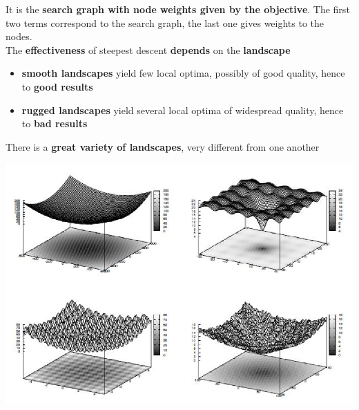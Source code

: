 \documentclass[11pt]{article}
\begin{document}
	It is the \textbf{search graph with node weights given by the objective}. The first two terms correspond to the search graph, the last one gives weights to the nodes.\\
	
	The \textbf{effectiveness} of steepest descent \textbf{depends} on the \textbf{landscape}
	\begin{itemize}
		\item \textbf{smooth landscapes} yield few local optima, possibly of good quality, hence to \textbf{good results}
		
		\item \textbf{rugged landscapes} yield several local optima of widespread quality, hence to \textbf{bad results}
	\end{itemize}
	
	There is a \textbf{great variety of landscapes}, very different from one another
	\begin{center}
		\includegraphics[width=0.9\columnwidth]{img/landscape1}
	\end{center}
	
	\newpage
	
\end{document}

